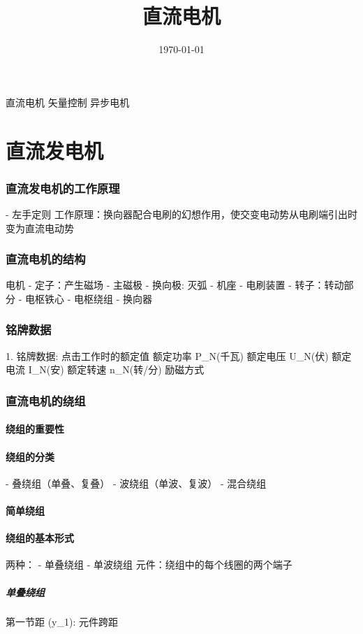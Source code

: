 \documentclass[12pt,a4paper]{article}
\title{直流电机}
\date{\today}
\begin{document}
\maketitle
直流电机
矢量控制
异步电机

\part{直流发电机}
\section{直流发电机的工作原理}
 - 左手定则
 工作原理：换向器配合电刷的幻想作用，使交变电动势从电刷端引出时变为直流电动势
 
\section{直流电机的结构}
电机
 - 定子：产生磁场
  - 主磁极
  - 换向极: 灭弧
  - 机座
  - 电刷装置
 - 转子：转动部分
  - 电枢铁心
  - 电枢绕组
  - 换向器

\section{铭牌数据}
1. 铭牌数据: 点击工作时的额定值
额定功率 P_N(千瓦)
额定电压 U_N(伏)
额定电流 I_N(安)
额定转速 n_N(转/分)
励磁方式

\section{直流电机的绕组}
\subsection{绕组的重要性}
\subsection{绕组的分类}
- 叠绕组（单叠、复叠）
- 波绕组（单波、复波）
- 混合绕组
\subsection{简单绕组}
\subsection{绕组的基本形式}
两种：
- 单叠绕组
- 单波绕组
元件：绕组中的每个线圈的两个端子
\subsubsection{单叠绕组}
第一节距 (y_1): 元件跨距
\end{document}
